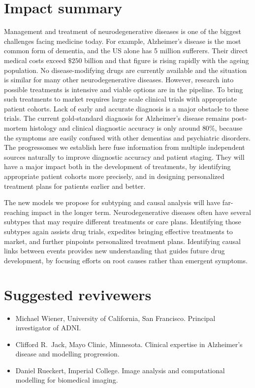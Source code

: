 \documentclass[a4paper,11pt]{article}
\begin{document}
\section*{Impact summary}

Management and treatment of neurodegenerative diseases is one of the
biggest challenges facing medicine today.  For example, Alzheimer's
disease is the most common form of dementia, and the US alone has 5
million sufferers.  Their direct medical costs exceed $\$250$ billion
and that figure is rising rapidly with the ageing population.  No
disease-modifying drugs are currently available and the situation is
similar for many other neurodegenerative diseases.  However, research
into possible treatments is intensive and viable options are in the
pipeline.  To bring such treatments to market requires large scale
clinical trials with appropriate patient cohorts.  Lack of early and
accurate diagnosis is a major obstacle to these trials.  The current
gold-standard diagnosis for Alzheimer's disease remains post-mortem
histology and clinical diagnostic accuracy is only around $80\%$,
because the symptoms are easily confused with other dementias and
psychiatric disorders.  The progressomes we establish here fuse
information from multiple independent sources naturally to improve
diagnostic accuracy and patient staging.  They will have a major
impact both in the development of treatments, by identifying
appropriate patient cohorts more precisely, and in designing
personalized treatment plans for patients earlier and better.

The new models we propose for subtyping and causal analysis will have
far-reaching impact in the longer term.  Neurodegenerative diseases
often have several subtypes that may require different treatments or
care plans.  Identifying those subtypes again assists drug trials,
expedites bringing effective treatments to market, and further
pinpoints personalized treatment plans.  Identifying causal links
between events provides new understanding that guides future drug
development, by focusing efforts on root causes rather than emergent
symptoms.


\section*{Suggested revivewers}

\begin{itemize}

\item Michael Wiener, University of California, San Francisco.
Principal investigator of ADNI.

\item Clifford R.\ Jack, Mayo Clinic, Minnesota.  Clinical expertise
in Alzheimer's disease and modelling progression.

\item Daniel Rueckert, Imperial College.  Image analysis and
computational modelling for biomedical imaging.

\end{itemize}
\end{document}
